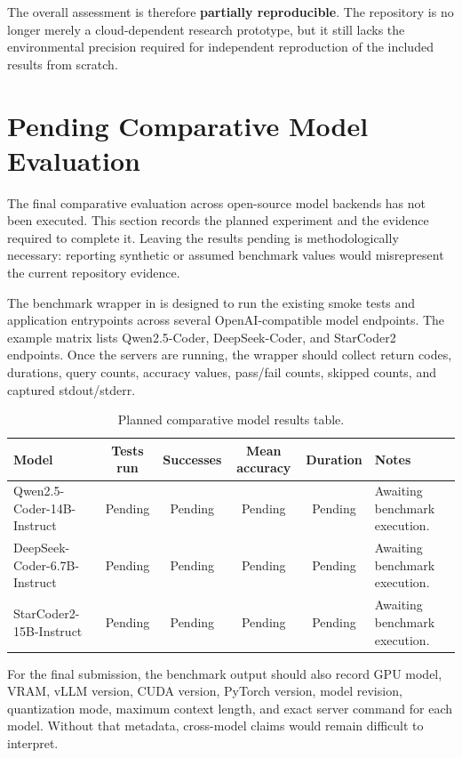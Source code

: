 \documentclass[11pt,a4paper]{article}
\begin{document}
The overall assessment is therefore \textbf{partially reproducible}. The repository is no longer merely a cloud-dependent research prototype, but it still lacks the environmental precision required for independent reproduction of the included results from scratch.

\section{Pending Comparative Model Evaluation}

\begin{pendingbox}
The final comparative evaluation across open-source model backends has not been executed. This section records the planned experiment and the evidence required to complete it. Leaving the results pending is methodologically necessary: reporting synthetic or assumed benchmark values would misrepresent the current repository evidence.
\end{pendingbox}

The benchmark wrapper in  is designed to run the existing smoke tests and application entrypoints across several OpenAI-compatible model endpoints. The example matrix lists Qwen2.5-Coder, DeepSeek-Coder, and StarCoder2 endpoints. Once the servers are running, the wrapper should collect return codes, durations, query counts, accuracy values, pass/fail counts, skipped counts, and captured stdout/stderr.

\begin{table}[htbp]
  \centering
  \caption{Planned comparative model results table.}
  \label{tab:pending-models}
  \begin{tabularx}{\textwidth}{YccccY}
    \toprule
    Model & Tests run & Successes & Mean accuracy & Duration & Notes \\
    \midrule
    Qwen2.5-Coder-14B-Instruct & Pending & Pending & Pending & Pending & Awaiting benchmark execution. \\
    DeepSeek-Coder-6.7B-Instruct & Pending & Pending & Pending & Pending & Awaiting benchmark execution. \\
    StarCoder2-15B-Instruct & Pending & Pending & Pending & Pending & Awaiting benchmark execution. \\
    \bottomrule
  \end{tabularx}
\end{table}

For the final submission, the benchmark output should also record GPU model, VRAM, vLLM version, CUDA version, PyTorch version, model revision, quantization mode, maximum context length, and exact server command for each model. Without that metadata, cross-model claims would remain difficult to interpret.
\end{document}
